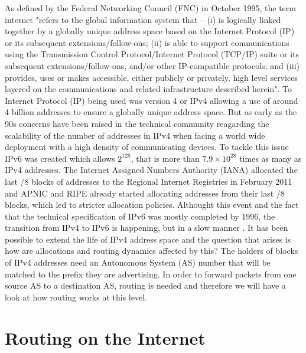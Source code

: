 \documentclass[11pt,a4paper]{scrreprt}
\begin{document}
As defined by the Federal Networking Council (FNC) in October 1995, the term internet "refers to the global information system that -- (i) is logically linked together by a globally unique address space based on the Internet Protocol (IP) or its subsequent extensions/follow-ons; (ii) is able to support communications using the Transmission Control Protocol/Internet Protocol (TCP/IP) suite or its subsequent extensions/follow-ons, and/or other IP-compatible protocols; and (iii) provides, uses or makes accessible, either publicly or privately, high level services layered on the communications and related infrastructure described herein". To Internet Protocol (IP) being used was version 4 or IPv4 allowing a use of around 4 billion addresses to ensure a globally unique address space. 
But as early as the 90s concerns have been raised in the technical community reagarding the scalability of the number of addresses in IPv4 when facing a world wide deployment with a high density of communicating devices. To tackle this issue IPv6 was created which allows $2^{128}$, that is more than $7.9 \times 10^{28}$ times as many as IPv4 addresses. 
The Internet Assigned Numbers Authority (IANA) allocated the last /8 blocks of addresses to the Regional Internet Registries in February 2011 and APNIC and RIPE already started allocating addresses from their last /8 blocks, which led to stricter allocation policies. Althought this event and the fact that the technical specification of IPv6 was mostly completed by 1996, the transition from IPv4 to IPv6 is happening, but in a slow manner \cite{GOOGLE_IPV6}. It has been possible to extend the life of IPv4 address space and the question that arises is how are allocations and routing dynamics affected by this?
The holders of blocks of IPv4 addresses need an Autonomous System (AS) number that will be matched to the prefix they are advertising. In order to forward packets from one source AS to a destination AS, routing is needed and therefore we will have a look at how routing works at this level. 

\section{Routing on the Internet}
\end{document}
